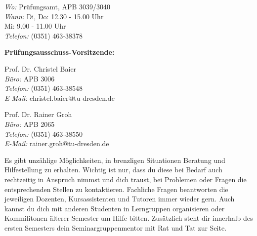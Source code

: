 \textit{Wo:} Prüfungsamt, APB 3039/3040 \\
\textit{Wann:} Di, Do: 12.30 - 15.00 Uhr \\
Mi: 9.00 - 11.00 Uhr \\
\textit{Telefon:} (0351) 463-38378

\textbf{Prüfungsausschuss-Vorsitzende:}

\begin{multicols}{2}
Prof. Dr. Christel Baier \\
\textit{Büro:} APB 3006 \\
\textit{Telefon:} (0351) 463-38548 \\
\textit{E-Mail:} christel.baier@tu-dresden.de

Prof. Dr. Rainer Groh \\
\textit{Büro:} APB 2065 \\
\textit{Telefon:} (0351) 463-38550 \\
\textit{E-Mail:} rainer.groh@tu-dresden.de
\end{multicols}

Es gibt unzählige Möglichkeiten, in brenzligen Situationen Beratung und Hilfestellung zu erhalten.
Wichtig ist nur, dass du diese bei Bedarf auch rechtzeitig in Anspruch nimmst und dich traust, bei Problemen oder Fragen die entsprechenden Stellen zu kontaktieren.
Fachliche Fragen beantworten die jeweiligen Dozenten, Kursassistenten und Tutoren immer wieder gern.
Auch kannst du dich mit anderen Studenten in Lerngruppen organisieren oder Kommilitonen älterer Semester um Hilfe bitten.
Zusätzlich steht dir innerhalb des ersten Semesters dein Seminargruppenmentor mit Rat und Tat zur Seite.
